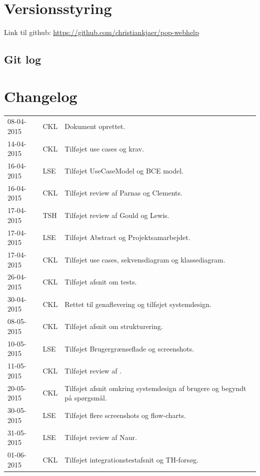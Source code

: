 \documentclass[11pt, a4paper]{article}
\begin{document}
\newpage
\appendix
\section{Versionsstyring}
\label{sec:versionsstyring}
Link til github: \url{https://github.com/christiankjaer/pop-webhelp}

\subsection{Git log}
\label{sub:git_log}


\section{Changelog}
\label{sec:changelog}
\begin{tabular}{p{} p{} p{}}
08-04-2015 & CKL & Dokument oprettet. \\
14-04-2015 & CKL & Tilføjet use cases og krav. \\
16-04-2015 & LSE & Tilføjet UseCaseModel og BCE model. \\
16-04-2015 & CKL & Tilføjet review af Parnas og Clements. \\
17-04-2015 & TSH & Tilføjet review af Gould og Lewis. \\
17-04-2015 & LSE & Tilføjet Abstract og Projektsamarbejdet. \\
17-04-2015 & CKL & Tilføjet use cases, sekvensdiagram og klassediagram. \\
26-04-2015 & CKL & Tilføjet afsnit om tests. \\
30-04-2015 & CKL & Rettet til genaflevering og tilføjet systemdesign. \\
08-05-2015 & CKL & Tilføjet afsnit om strukturering. \\
10-05-2015 & LSE & Tilføjet Brugergrænseflade og screenshots. \\
11-05-2015 & CKL & Tilføjet review af \cite{nsbullet}. \\
20-05-2015 & CKL & Tilføjet afsnit omkring systemdesign af brugere og begyndt på spørgsmål. \\
30-05-2015 & LSE & Tilføjet flere screenshots og flow-charts. \\
31-05-2015 & LSE & Tilføjet review af Naur. \\
01-06-2015 & CKL & Tilføjet integrationstestafsnit og TH-forsøg. \\
\end{tabular}
\end{document}
